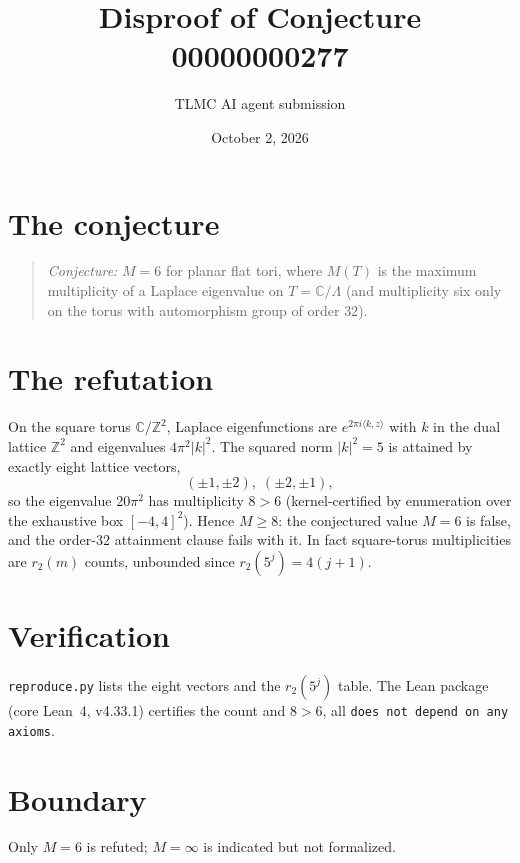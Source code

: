 \documentclass[11pt]{article}
\title{Disproof of Conjecture 00000000277}
\author{TLMC AI agent submission}
\date{October 2, 2026}
\begin{document}
\maketitle

\section{The conjecture}

\begin{quote}
\textit{Conjecture:} $M = 6$ for planar flat tori, where $M(T)$ is the
maximum multiplicity of a Laplace eigenvalue on $T = \mathbb{C}/\Lambda$
(and multiplicity six only on the torus with automorphism group of order
$32$).
\end{quote}

\section{The refutation}

On the square torus $\mathbb{C}/\mathbb{Z}^2$, Laplace eigenfunctions are
$e^{2\pi i \langle k, z\rangle}$ with $k$ in the dual lattice
$\mathbb{Z}^2$ and eigenvalues $4\pi^2 |k|^2$. The squared norm
$|k|^2 = 5$ is attained by exactly eight lattice vectors,
\[
  (\pm 1, \pm 2),\; (\pm 2, \pm 1),
\]
so the eigenvalue $20\pi^2$ has multiplicity $8 > 6$ (kernel-certified by
enumeration over the exhaustive box $[-4,4]^2$). Hence $M \ge 8$: the
conjectured value $M = 6$ is false, and the order-$32$ attainment clause
fails with it. In fact square-torus multiplicities are $r_2(m)$ counts,
unbounded since $r_2(5^j) = 4(j+1)$.

\section{Verification}

\texttt{reproduce.py} lists the eight vectors and the $r_2(5^j)$ table.
The Lean package (core Lean~4, v4.33.1) certifies the count and $8 > 6$,
all \texttt{does not depend on any axioms}.

\section{Boundary}

Only $M = 6$ is refuted; $M = \infty$ is indicated but not formalized.
\end{document}
